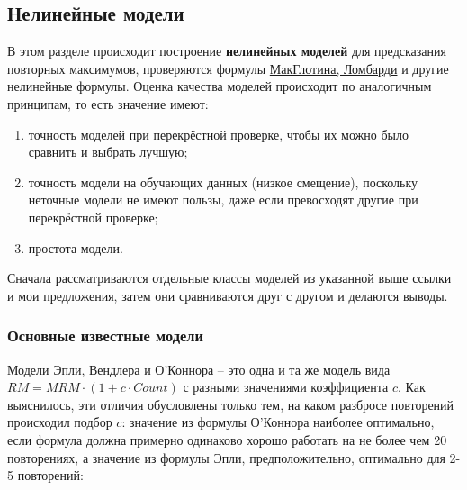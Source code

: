 \documentclass[
]{article}
\begin{document}
\hypertarget{ux43dux435ux43bux438ux43dux435ux439ux43dux44bux435-ux43cux43eux434ux435ux43bux438}{%
\subsection{Нелинейные
модели}\label{ux43dux435ux43bux438ux43dux435ux439ux43dux44bux435-ux43cux43eux434ux435ux43bux438}}

В этом разделе происходит построение \textbf{нелинейных моделей} для
предсказания повторных максимумов, проверяются формулы
\href{https://ru.wikipedia.org/wiki/Одно_повторение_с_максимальным_весом\#МакГлотин_(McGlothin)}{МакГлотина,
Ломбарди} и другие нелинейные формулы. Оценка качества моделей
происходит по аналогичным принципам, то есть значение имеют:

\begin{enumerate}
\def\labelenumi{\arabic{enumi}.}
\item
  точность моделей при перекрёстной проверке, чтобы их можно было
  сравнить и выбрать лучшую;
\item
  точность модели на обучающих данных (низкое смещение), поскольку
  неточные модели не имеют пользы, даже если превосходят другие при
  перекрёстной проверке;
\item
  простота модели.
\end{enumerate}

Сначала рассматриваются отдельные классы моделей из указанной выше
ссылки и мои предложения, затем они сравниваются друг с другом и
делаются выводы.

\hypertarget{ux43eux441ux43dux43eux432ux43dux44bux435-ux438ux437ux432ux435ux441ux442ux43dux44bux435-ux43cux43eux434ux435ux43bux438}{%
\subsubsection{Основные известные
модели}\label{ux43eux441ux43dux43eux432ux43dux44bux435-ux438ux437ux432ux435ux441ux442ux43dux44bux435-ux43cux43eux434ux435ux43bux438}}

Модели Эпли, Вендлера и О'Коннора -- это одна и та же модель вида
\(RM=MRM \cdot(1+c \cdot Count)\) с разными значениями коэффициента
\(c\). Как выяснилось, эти отличия обусловлены только тем, на каком
разбросе повторений происходил подбор \(c\): значение из формулы
О'Коннора наиболее оптимально, если формула должна примерно одинаково
хорошо работать на не более чем 20 повторениях, а значение из формулы
Эпли, предположительно, оптимально для 2-5 повторений:
\end{document}
